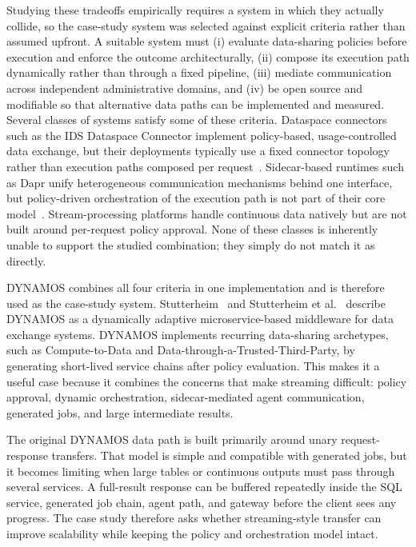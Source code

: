 Studying these tradeoffs empirically requires a system in which they actually collide, so the case-study system was selected against explicit criteria rather than assumed upfront. A suitable system must (i) evaluate data-sharing policies before execution and enforce the outcome architecturally, (ii) compose its execution path dynamically rather than through a fixed pipeline, (iii) mediate communication across independent administrative domains, and (iv) be open source and modifiable so that alternative data paths can be implemented and measured. Several classes of systems satisfy some of these criteria. Dataspace connectors such as the IDS Dataspace Connector implement policy-based, usage-controlled data exchange, but their deployments typically use a fixed connector topology rather than execution paths composed per request~\cite{idsa2023usagecontrol,neumaier2021policyaware}. Sidecar-based runtimes such as Dapr unify heterogeneous communication mechanisms behind one interface, but policy-driven orchestration of the execution path is not part of their core model~\cite{figueira2024selfadaptive}. Stream-processing platforms handle continuous data natively but are not built around per-request policy approval. None of these classes is inherently unable to support the studied combination; they simply do not match it as directly.

DYNAMOS combines all four criteria in one implementation and is therefore used as the case-study system. Stutterheim~\cite{stutterheim2023thesis} and Stutterheim et al.~\cite{stutterheim2023icsa} describe DYNAMOS as a dynamically adaptive microservice-based middleware for data exchange systems. DYNAMOS implements recurring data-sharing archetypes, such as Compute-to-Data and Data-through-a-Trusted-Third-Party, by generating short-lived service chains after policy evaluation. This makes it a useful case because it combines the concerns that make streaming difficult: policy approval, dynamic orchestration, sidecar-mediated agent communication, generated jobs, and large intermediate results.

The original DYNAMOS data path is built primarily around unary request-response transfers. That model is simple and compatible with generated jobs, but it becomes limiting when large tables or continuous outputs must pass through several services. A full-result response can be buffered repeatedly inside the SQL service, generated job chain, agent path, and gateway before the client sees any progress. The case study therefore asks whether streaming-style transfer can improve scalability while keeping the policy and orchestration model intact.

